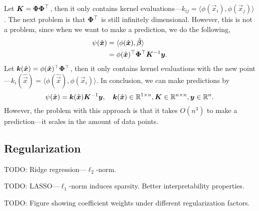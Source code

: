 Let $\bm{K} = \bm{\Phi} \bm{\Phi}^\top$, then it only contains kernel evaluations---$k_{ij} = \langle \phi(\vec{x}_i), \phi(\vec{x}_j) \rangle$. The next problem is that $\bm{\Phi}^\top$ is still infinitely dimensional. However, this is not a problem, since when we want to make a prediction, we do the following,
\begin{align*}
    \psi(\hat{\bm{x}}) & = \langle \phi(\hat{\bm{x}}), \hat{\bm{\beta}} \rangle                        \\
                        & = \phi(\hat{\bm{x}})^\top \bm{\Phi}^\top \bm{K}^{-1} \bm{y}.
\end{align*}
Let $\bm{k}(\hat{\bm{x}}) = \phi(\hat{\bm{x}})^\top \bm{\Phi}^\top$, then it only contains kernel evaluations with the new point---$k_i(\hat{\vec{x}}) = \langle \phi(\hat{\vec{x}}), \phi(\vec{x}_i) \rangle$. In conclusion, we can make predictions by \[
    \psi(\hat{\bm{x}}) = \bm{k}(\hat{\bm{x}}) \bm{K}^{-1} \bm{y}, \quad \bm{k}(\hat{\bm{x}}) \in \mathbb{R}^{1 \times n}, \bm{K} \in \mathbb{R}^{n \times n}, \bm{y} \in \mathbb{R}^n.
\]
However, the problem with this approach is that it takes $O(n^3)$ to make a prediction---it scales
in the amount of data points.

\subsection{Regularization}

TODO: Ridge regression---$\ell_2$-norm.

TODO: LASSO---$\ell_1$-norm induces sparsity. Better interpretability properties.

TODO: Figure showing coefficient weights under different regularization factors.
